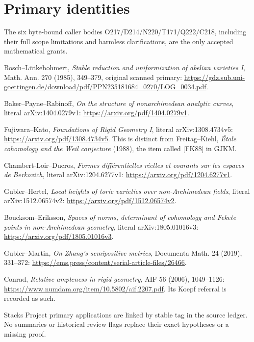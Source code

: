 \documentclass[
  11pt,
]{article}
\begin{document}
\section{Primary identities}\label{primary-identities}

The six byte-bound caller bodies O217/D214/N220/T171/Q222/C218,
including their full scope limitations and harmless clarifications, are
the only accepted mathematical grants.

Bosch--Lütkebohmert, \emph{Stable reduction and uniformization of
abelian varieties I}, Math. Ann. 270 (1985), 349--379, original scanned
primary:
\url{https://gdz.sub.uni-goettingen.de/download/pdf/PPN235181684_0270/LOG_0034.pdf}.

Baker--Payne--Rabinoff, \emph{On the structure of nonarchimedean
analytic curves}, literal arXiv:1404.0279v1:
\url{https://arxiv.org/pdf/1404.0279v1}.

Fujiwara--Kato, \emph{Foundations of Rigid Geometry I}, literal
arXiv:1308.4734v5: \url{https://arxiv.org/pdf/1308.4734v5}. This is
distinct from Freitag--Kiehl, \emph{Étale cohomology and the Weil
conjecture} (1988), the item called {[}FK88{]} in GJKM.

Chambert-Loir--Ducros, \emph{Formes différentielles réelles et courants
sur les espaces de Berkovich}, literal arXiv:1204.6277v1:
\url{https://arxiv.org/pdf/1204.6277v1}.

Gubler--Hertel, \emph{Local heights of toric varieties over
non-Archimedean fields}, literal arXiv:1512.06574v2:
\url{https://arxiv.org/pdf/1512.06574v2}.

Boucksom--Eriksson, \emph{Spaces of norms, determinant of cohomology and
Fekete points in non-Archimedean geometry}, literal arXiv:1805.01016v3:
\url{https://arxiv.org/pdf/1805.01016v3}.

Gubler--Martin, \emph{On Zhang's semipositive metrics}, Documenta Math.
24 (2019), 331--372:
\url{https://ems.press/content/serial-article-files/26466}.

Conrad, \emph{Relative ampleness in rigid geometry}, AIF 56 (2006),
1049--1126: \url{https://www.numdam.org/item/10.5802/aif.2207.pdf}. Its
Koepf referral is recorded as such.

Stacks Project primary applications are linked by stable tag in the
source ledger. No summaries or historical review flags replace their
exact hypotheses or a missing proof.
\end{document}
